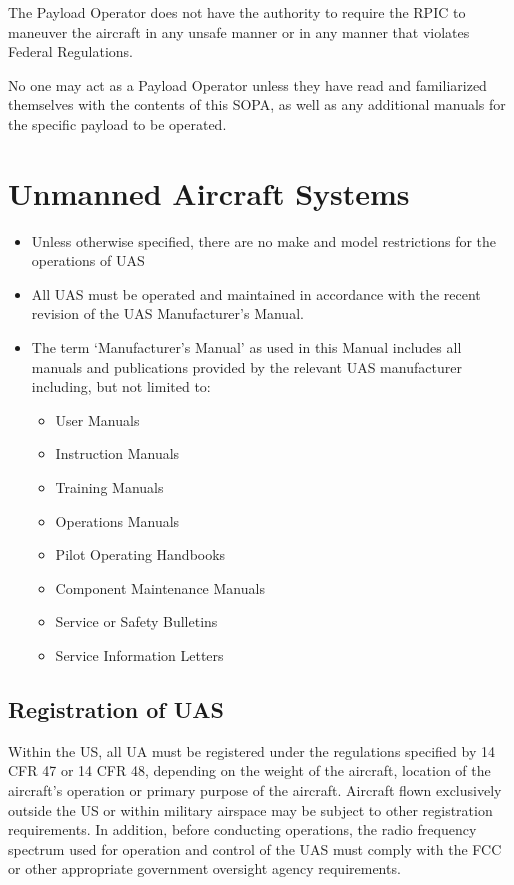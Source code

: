 \documentclass[
]{book}
\providecommand{\tightlist}{%
  \setlength{\itemsep}{0pt}\setlength{\parskip}{0pt}}
\begin{document}
The Payload Operator does not have the authority to require the RPIC to maneuver the aircraft in any unsafe manner or in any manner that violates Federal Regulations.

No one may act as a Payload Operator unless they have read and familiarized themselves with the contents of this SOPA, as well as any additional manuals for the specific payload to be operated.

\hypertarget{ch-UAS}{%
\chapter{Unmanned Aircraft Systems}\label{ch-UAS}}

\begin{itemize}
\item
  Unless otherwise specified, there are no make and model restrictions for the operations of UAS
\item
  All UAS must be operated and maintained in accordance with the recent revision of the UAS Manufacturer's Manual.
\item
  The term `Manufacturer's Manual' as used in this Manual includes all manuals and publications provided by the relevant UAS manufacturer including, but not limited to:

  \begin{itemize}
  \tightlist
  \item
    User Manuals
  \item
    Instruction Manuals
  \item
    Training Manuals
  \item
    Operations Manuals
  \item
    Pilot Operating Handbooks
  \item
    Component Maintenance Manuals
  \item
    Service or Safety Bulletins
  \item
    Service Information Letters
  \end{itemize}
\end{itemize}

\hypertarget{registration-of-uas}{%
\section{Registration of UAS}\label{registration-of-uas}}

Within the US, all UA must be registered under the regulations specified by 14 CFR 47 or 14 CFR 48, depending on the weight of the aircraft, location of the aircraft's operation or primary purpose of the aircraft. Aircraft flown exclusively outside the US or within military airspace may be subject to other registration requirements. In addition, before conducting operations, the radio frequency spectrum used for operation and control of the UAS must comply with the FCC or other appropriate government oversight agency requirements.
\end{document}

